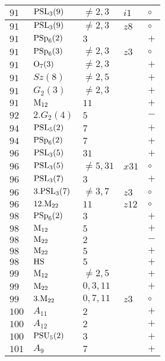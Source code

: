 \documentclass[a4paper, 11pt]{article}
\begin{document}
\begin{longtable}{lllll}
		$91$ & ${\rm PSL}_{3}(9)$ & $\neq 2,3$ & $i1$ & $\circ$ \\ \hline
		$91$ & ${\rm PSL}_{3}(9)$ & $\neq 2,3$ & $z8$ & $\circ$ \\ \hline
		$91$ & ${\rm PSp}_{6}(2)$ & $3$ &  & $+$ \\ \hline
		$91$ & ${\rm PSp}_{6}(3)$ & $\neq 2,3$ & $z3$ & $\circ$ \\ \hline
		$91$ & ${\rm O}_{7}(3)$ & $\neq 2,3$ &  & $+$ \\ \hline
		$91$ & $Sz(8)$ & $\neq 2,5$ &  & $+$ \\ \hline
		$91$ & $G_{2}(3)$ & $\neq 2,3$ &  & $+$ \\ \hline
		$91$ & ${\rm M}_{12}$ & $11$ &  & $+$ \\ \hline
		$92$ & $2.G_{2}(4)$ & $5$ &  & $-$ \\ \hline
		$94$ & ${\rm PSL}_{5}(2)$ & $7$ &  & $+$ \\ \hline
		$94$ & ${\rm PSp}_{6}(2)$ & $7$ &  & $+$ \\ \hline
		$96$ & ${\rm PSL}_{3}(5)$ & $31$ &  & $+$ \\ \hline
		$96$ & ${\rm PSL}_{3}(5)$ & $\neq 5,31$ & $x31$ & $\circ$ \\ \hline
		$96$ & ${\rm PSL}_{3}(7)$ & $3$ &  & $+$ \\ \hline
		$96$ & $3.{\rm PSL}_{3}(7)$ & $\neq 3,7$ & $z3$ & $\circ$ \\ \hline
		$96$ & $12.{\rm M}_{22}$ & $11$ & $z12$ & $\circ$ \\ \hline
		$98$ & ${\rm PSp}_{6}(2)$ & $3$ &  & $+$ \\ \hline
		$98$ & ${\rm M}_{12}$ & $5$ &  & $+$ \\ \hline
		$98$ & ${\rm M}_{22}$ & $2$ &  & $-$ \\ \hline
		$98$ & ${\rm M}_{22}$ & $5$ &  & $+$ \\ \hline
		$98$ & ${\rm HS}$ & $5$ &  & $+$ \\ \hline
		$99$ & ${\rm M}_{12}$ & $\neq 2,5$ &  & $+$ \\ \hline
		$99$ & ${\rm M}_{22}$ & $0, 3, 11$ &  & $+$ \\ \hline
		$99$ & $3.{\rm M}_{22}$ & $0,7,11$ & $z3$ & $\circ$ \\ \hline
		$100$ & $A_{11}$ & $2$ &  & $+$ \\ \hline
		$100$ & $A_{12}$ & $2$ &  & $+$ \\ \hline
		$100$ & ${\rm PSU}_{5}(2)$ & $3$ &  & $+$ \\ \hline
		$101$ & $A_{9}$ & $7$ &  & $+$ \\ \hline

\end{longtable}
\end{document}
